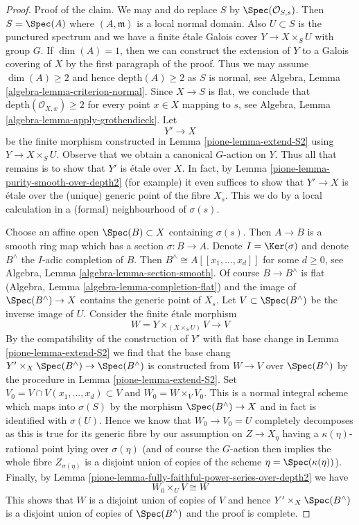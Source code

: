\begin{proof}
\medskip\noindent
Proof of the claim. We may and do replace $S$ by $\Spec(\mathcal{O}_{S, s})$.
Then $S = \Spec(A)$ where $(A, \mathfrak m)$ is a local normal domain.
Also $U \subset S$ is the punctured spectrum and we have a finite
\'etale Galois cover $Y \to X \times_S U$ with group $G$.
If $\dim(A) = 1$, then we can construct the extension of $Y$ to
a Galois covering of $X$ by the first paragraph of the proof.
Thus we may assume $\dim(A) \geq 2$ and hence $\text{depth}(A) \geq 2$
as $S$ is normal, see Algebra, Lemma \ref{algebra-lemma-criterion-normal}.
Since $X \to S$ is flat, we conclude that
$\text{depth}(\mathcal{O}_{X, x}) \geq 2$ for every point $x \in X$
mapping to $s$, see
Algebra, Lemma \ref{algebra-lemma-apply-grothendieck}.
Let
$$
Y' \longrightarrow X
$$
be the finite morphism constructed in Lemma \ref{pione-lemma-extend-S2}
using $Y \to X \times_S U$. Observe that we obtain a canonical
$G$-action on $Y$. Thus all that remains is to show that $Y'$
is \'etale over $X$. In fact, by
Lemma \ref{pione-lemma-purity-smooth-over-depth2} (for example)
it even suffices to show that $Y' \to X$ is \'etale over the
(unique) generic point of the fibre $X_s$. This we do by
a local calculation in a (formal) neighbourhood of $\sigma(s)$.

\medskip\noindent
Choose an affine open $\Spec(B) \subset X$ containing $\sigma(s)$.
Then $A \to B$ is a smooth ring map which has a section $\sigma : B \to A$.
Denote $I = \Ker(\sigma)$ and denote $B^\wedge$ the
$I$-adic completion of $B$. Then $B^\wedge \cong A[[x_1, \ldots, x_d]]$
for some $d \geq 0$, see
Algebra, Lemma \ref{algebra-lemma-section-smooth}.
Of course $B \to B^\wedge$ is flat
(Algebra, Lemma \ref{algebra-lemma-completion-flat})
and the image of $\Spec(B^\wedge) \to X$ contains the generic point of $X_s$.
Let $V \subset \Spec(B^\wedge)$ be the inverse image of $U$.
Consider the finite \'etale morphism
$$
W = Y \times_{(X \times_S U)} V \longrightarrow V
$$
By the compatibility of the construction of $Y'$
with flat base change in Lemma \ref{pione-lemma-extend-S2}
we find that the base chang
$Y' \times_X \Spec(B^\wedge) \to \Spec(B^\wedge)$
is constructed from $W \to V$ over $\Spec(B^\wedge)$
by the procedure in Lemma \ref{pione-lemma-extend-S2}.
Set $V_0 = V \cap V(x_1, \ldots, x_d) \subset V$ and $W_0 = W \times_V V_0$.
This is a normal integral scheme which maps into $\sigma(S)$
by the morphism $\Spec(B^\wedge) \to X$ and in fact is identified
with $\sigma(U)$. Hence we know that $W_0 \to V_0 = U$ completely decomposes
as this is true for its generic fibre by our assumption
on $Z \to X_\eta$ having a $\kappa(\eta)$-rational point lying over
$\sigma(\eta)$ (and of course the $G$-action then implies the whole
fibre $Z_{\sigma(\eta)}$ is a disjoint union of copies of
the scheme $\eta = \Spec(\kappa(\eta))$).
Finally, by
Lemma \ref{pione-lemma-fully-faithful-power-series-over-depth2}
we have
$$
W_0 \times_U V \cong W
$$
This shows that $W$ is a disjoint union of copies of $V$
and hence $Y' \times_X \Spec(B^\wedge)$ is a disjoint
union of copies of $\Spec(B^\wedge)$ and the proof is complete.
\end{proof}

